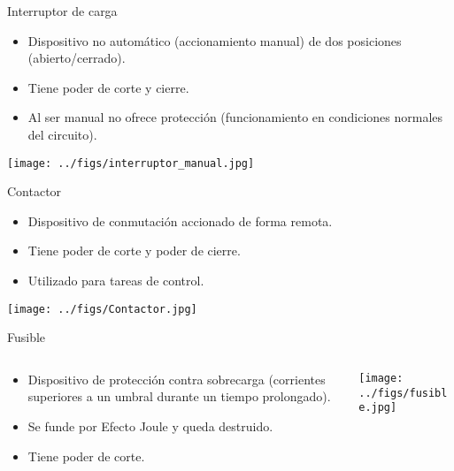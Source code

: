 \documentclass[xcolor={usenames,svgnames,dvipsnames}]{beamer}
\begin{document}
\begin{frame}[label={sec:org9b2e299}]{Interruptor de carga}
\begin{itemize}
\item Dispositivo no automático (\alert{accionamiento manual}) de dos posiciones (abierto/cerrado).

\item Tiene \alert{poder de corte y cierre}.

\item Al ser manual \alert{no ofrece protección} (funcionamiento en condiciones normales del circuito).
\end{itemize}
\begin{center}
\texttt{[image: ../figs/interruptor\_manual.jpg]}
\end{center}
\end{frame}


\begin{frame}[label={sec:org7df2247}]{Contactor}
\begin{itemize}
\item Dispositivo de conmutación accionado de forma remota.
\item Tiene poder de corte y poder de cierre.
\item Utilizado para tareas de control.
\end{itemize}

\begin{center}
\texttt{[image: ../figs/Contactor.jpg]}
\end{center}
\end{frame}


\begin{frame}[label={sec:org4a8fff4}]{Fusible}
\begin{columns}
\begin{column}{0.7\columnwidth}
\begin{itemize}
\item Dispositivo de protección contra sobrecarga (corrientes superiores a un umbral durante un tiempo prolongado).

\item Se funde por Efecto Joule y queda destruido.

\item Tiene poder de corte.
\end{itemize}
\end{column}
\begin{column}{0.3\columnwidth}
\begin{center}
\texttt{[image: ../figs/fusible.jpg]}
\end{center}
\end{column}
\end{columns}
\end{frame}
\end{document}
